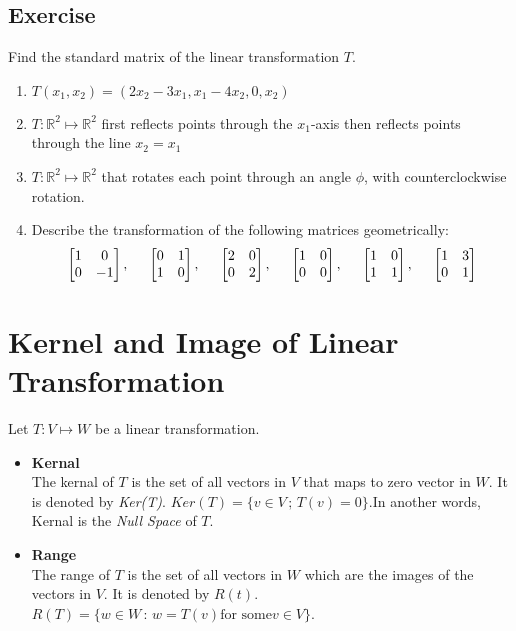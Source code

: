 \documentclass[aima104_lecturenotes_ku.tex]{subfiles}
\begin{document}
\subsection{Exercise}
Find the standard matrix of the linear transformation $T$.
\begin{enumerate}
\item $T(x_1,x_2) = (2x_2-3x_1, x_1-4x_2, 0, x_2) $
\item $T:\mathbb{R} ^2 \mapsto \mathbb{R} ^2$ first reflects points through the $x_1$-axis then reflects points through the line $x_2 = x_1$
\item $T:\mathbb{R} ^2 \mapsto \mathbb{R} ^2$ that rotates each point through an angle $\phi$, with counterclockwise rotation.

\item Describe the transformation of the following matrices geometrically:
  $$\begin{bmatrix}
    1 & 0\\
    0 & -1
  \end{bmatrix}, \hspace{5mm} \begin{bmatrix}
    0 & 1 \\
    1 & 0
  \end{bmatrix}, \hspace{5mm} \begin{bmatrix}
    2 & 0 \\
    0 & 2
  \end{bmatrix}, \hspace{5mm} \begin{bmatrix}
    1 & 0 \\
    0 & 0
  \end{bmatrix}, \hspace{5mm} \begin{bmatrix}
    1 & 0 \\
    1 & 1
  \end{bmatrix}, \hspace{5mm} \begin{bmatrix}
    1 & 3 \\
    0 & 1
  \end{bmatrix}$$
\end{enumerate}

\section{Kernel and Image of Linear Transformation}
Let $T:V \mapsto W$ be a linear transformation.
\begin{itemize}
\item \textbf{Kernal}\\[1mm]
  The kernal of $T$ is the set of all vectors in $V$ that maps to zero vector in $W$. It is denoted by \textit{Ker(T)}. $Ker(T)=\{v \in V\, ; \, T(v)=0\}$.In another words, Kernal is the \textit{Null Space} of $T$.
\item \textbf{Range} \\[1mm]
  The range of $T$ is the set of all vectors in $W$ which are the images of the vectors in $V$. It is denoted by $R(t)$. $R(T)=\{w \in W \, : \, w = T(v) \text{for some}  v \in V\}$.
\end{itemize}
\end{document}
